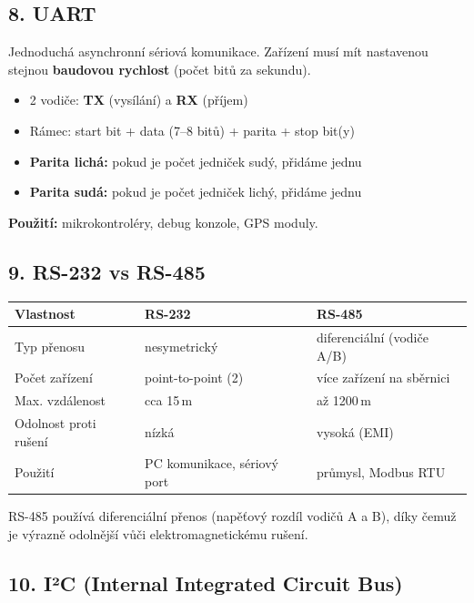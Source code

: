 \documentclass[a4paper,10pt]{article}
\begin{document}
\begin{vysvetlenibox}
\subsection*{8. UART}

Jednoduchá asynchronní sériová komunikace. Zařízení musí mít nastavenou stejnou \textbf{baudovou rychlost} (počet bitů za sekundu).

\begin{itemize}
  \item 2 vodiče: \textbf{TX} (vysílání) a \textbf{RX} (příjem)
  \item Rámec: start bit + data (7–8 bitů) + parita + stop bit(y)
  \item \textbf{Parita lichá:} pokud je počet jedniček sudý, přidáme jednu
  \item \textbf{Parita sudá:} pokud je počet jedniček lichý, přidáme jednu
\end{itemize}
\textbf{Použití:} mikrokontroléry, debug konzole, GPS moduly.

\subsection*{9. RS-232 vs RS-485}

\begin{center}
\begin{tabularx}{0.97\linewidth}{@{} l X X @{}}
\toprule
\textbf{Vlastnost} & \textbf{RS-232} & \textbf{RS-485} \\
\midrule
Typ přenosu & nesymetrický & diferenciální (vodiče A/B) \\
Počet zařízení & point-to-point (2) & více zařízení na sběrnici \\
Max. vzdálenost & cca 15\,m & až 1200\,m \\
Odolnost proti rušení & nízká & vysoká (EMI) \\
Použití & PC komunikace, sériový port & průmysl, Modbus RTU \\
\bottomrule
\end{tabularx}
\end{center}

RS-485 používá diferenciální přenos (napěťový rozdíl vodičů A a B), díky čemuž je výrazně odolnější vůči elektromagnetickému rušení.

\subsection*{10. I²C (Internal Integrated Circuit Bus)}


\end{vysvetlenibox}
\end{document}
